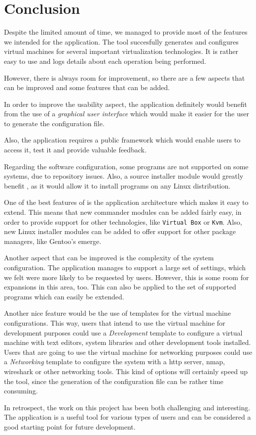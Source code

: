 \chapter{Conclusion} \label{chapter:epilogue}
Despite the limited amount of time, we managed to provide most of the 
features we intended for the application. The tool succesfully generates and 
configures virtual machines for several important virtualization technologies. It
is rather easy to use and logs details about each operation being performed.

However, there is always room for improvement, so there are a few aspects 
that can be improved and some features that can be added.

In order to improve the usability aspect, the application definitely would 
benefit from the use of a \emph{graphical user interface} which would make 
it easier for the user to generate the configuration file.

Also, the application requires a public framework which would enable users to access 
it, test it and provide valuable feedback.

Regarding the software configuration, some programs are not supported on some 
systems, due to repository issues. Also, a source installer module would greatly 
benefit \project, as it would allow it to install programs on any Linux distribution.

One of the best features of \project is the application architecture which makes it easy to 
extend. This means that new commander modules can be added fairly easy, in 
order to provide support for other technologies, like \texttt{Virtual Box} or \texttt{Kvm}. Also, 
new Linux installer modules can be added to offer support for other package 
managers, like Gentoo's emerge.

Another aspect that can be improved is the complexity of the system 
configuration. The application manages to support a large set of settings, 
which we felt were more likely to be requested by users. However, this is some 
room for expansions in this area, too. This can also be applied to the set of 
supported programs which can easily be extended.

Another nice feature would be the use of templates for the virtual machine 
configurations. This way, users that intend to use the virtual machine for 
development purposes could use a \emph{Development} template to configure a 
virtual machine with text editors, system libraries and other development tools 
installed. Users that are going to use the virtual machine for networking 
purposes could use a \emph{Networking} template to configure the system with a 
http server, nmap, wireshark or other networking tools. This kind of options 
will certainly speed up the tool, since the generation of the configuration 
file can be rather time consuming.

In retrospect, the work on this project has been both challenging and 
interesting. The application is a useful tool for various types of users and 
can be considered a good starting point for future development.